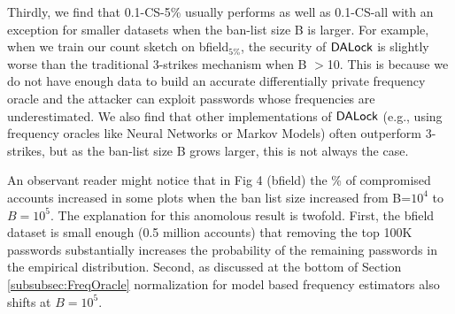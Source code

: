 Thirdly,  we find that 0.1-CS-5\% usually performs as well as 0.1-CS-all with an exception for smaller datasets when the ban-list size B is larger. For example, when we train our count sketch on bfield$_{5\%}$, the security of $\mathsf{DALock}$ is slightly worse than the traditional 3-strikes mechanism when B $>$10. This is because we do not have enough data to build an accurate differentially private frequency oracle and the attacker can exploit passwords whose frequencies are underestimated. We also find that other implementations of $\mathsf{DALock}$ (e.g., using frequency oracles like Neural Networks or Markov Models) often outperform 3-strikes, but as the ban-list size B grows larger, this is not always the case. 	

{An observant reader might notice that in Fig 4 (bfield) the  \% of compromised accounts increased in some plots when the ban list size increased from B=$10^4$ to $B=10^5$. The explanation for this anomolous result is twofold. First, the bfield dataset is small enough (0.5 million accounts) that removing the top 100K passwords substantially increases the probability of the remaining passwords in the empirical distribution. Second, as discussed at the bottom of Section \ref{subsubsec:FreqOracle} normalization for model based frequency estimators also shifts at $B=10^5$. }


\vspace*{-\baselineskip}
\vspace*{-\baselineskip}

